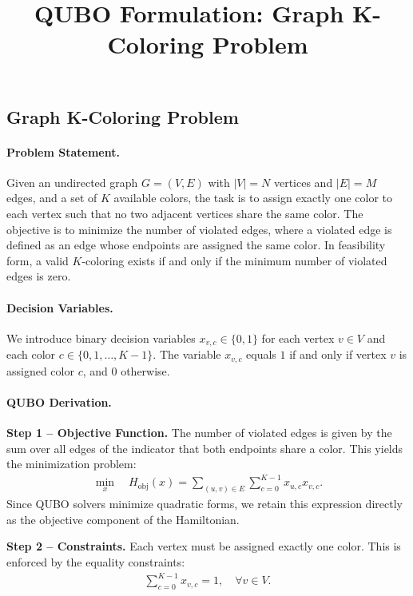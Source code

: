 \documentclass[12pt]{article}
\title{QUBO Formulation: Graph K-Coloring Problem}
\date{}
\begin{document}
\maketitle

\subsection*{Graph K-Coloring Problem}

\paragraph{Problem Statement.}
Given an undirected graph $G=(V,E)$ with $|V|=N$ vertices and $|E|=M$ edges, and a set of $K$ available colors, the task is to assign exactly one color to each vertex such that no two adjacent vertices share the same color. The objective is to minimize the number of violated edges, where a violated edge is defined as an edge whose endpoints are assigned the same color. In feasibility form, a valid $K$-coloring exists if and only if the minimum number of violated edges is zero.

\paragraph{Decision Variables.}
We introduce binary decision variables $x_{v,c} \in \{0,1\}$ for each vertex $v \in V$ and each color $c \in \{0, 1, \dots, K-1\}$. The variable $x_{v,c}$ equals $1$ if and only if vertex $v$ is assigned color $c$, and $0$ otherwise.

\paragraph{QUBO Derivation.}
\textbf{Step 1 -- Objective Function.} The number of violated edges is given by the sum over all edges of the indicator that both endpoints share a color. This yields the minimization problem:
\begin{align}
    \min_{x} \quad H_{\text{obj}}(x) = \sum_{(u,v) \in E} \sum_{c=0}^{K-1} x_{u,c} x_{v,c}.
\end{align}
Since QUBO solvers minimize quadratic forms, we retain this expression directly as the objective component of the Hamiltonian.

\textbf{Step 2 -- Constraints.} Each vertex must be assigned exactly one color. This is enforced by the equality constraints:
\begin{align}
    \sum_{c=0}^{K-1} x_{v,c} = 1, \quad \forall v \in V.
\end{align}
\end{document}
